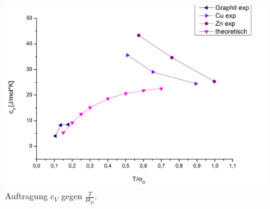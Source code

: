 \documentclass[12pt,a4paper,titlepage,headinclude,bibtotoc]{scrartcl}
\begin{document}
\begin{figure}
\includegraphics[width=13.5cm]{SUMM.jpeg}
\caption{Auftragung $\text{c}_V$ gegen $\frac{T}{\Theta_D}$.}
\end{figure}
\FloatBarrier
\end{document}
